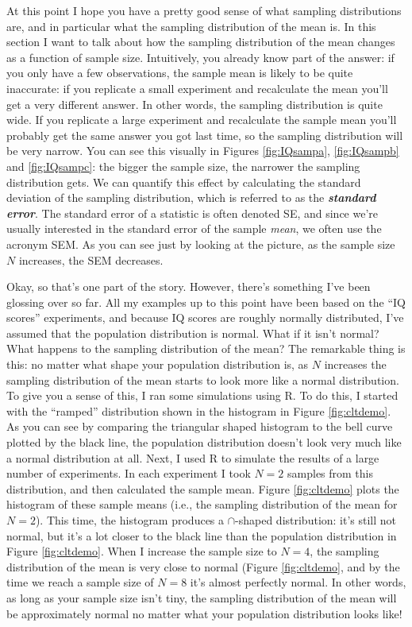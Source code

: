 \documentclass[
]{book}
\begin{document}
At this point I hope you have a pretty good sense of what sampling distributions are, and in particular what the sampling distribution of the mean is. In this section I want to talk about how the sampling distribution of the mean changes as a function of sample size. Intuitively, you already know part of the answer: if you only have a few observations, the sample mean is likely to be quite inaccurate: if you replicate a small experiment and recalculate the mean you'll get a very different answer. In other words, the sampling distribution is quite wide. If you replicate a large experiment and recalculate the sample mean you'll probably get the same answer you got last time, so the sampling distribution will be very narrow. You can see this visually in Figures \ref{fig:IQsampa}, \ref{fig:IQsampb} and \ref{fig:IQsampc}: the bigger the sample size, the narrower the sampling distribution gets. We can quantify this effect by calculating the standard deviation of the sampling distribution, which is referred to as the \textbf{\emph{standard error}}. The standard error of a statistic is often denoted SE, and since we're usually interested in the standard error of the sample \emph{mean}, we often use the acronym SEM. As you can see just by looking at the picture, as the sample size \(N\) increases, the SEM decreases.

Okay, so that's one part of the story. However, there's something I've been glossing over so far. All my examples up to this point have been based on the ``IQ scores'' experiments, and because IQ scores are roughly normally distributed, I've assumed that the population distribution is normal. What if it isn't normal? What happens to the sampling distribution of the mean? The remarkable thing is this: no matter what shape your population distribution is, as \(N\) increases the sampling distribution of the mean starts to look more like a normal distribution. To give you a sense of this, I ran some simulations using R. To do this, I started with the ``ramped'' distribution shown in the histogram in Figure \ref{fig:cltdemo}. As you can see by comparing the triangular shaped histogram to the bell curve plotted by the black line, the population distribution doesn't look very much like a normal distribution at all. Next, I used R to simulate the results of a large number of experiments. In each experiment I took \(N=2\) samples from this distribution, and then calculated the sample mean. Figure \ref{fig:cltdemo} plots the histogram of these sample means (i.e., the sampling distribution of the mean for \(N=2\)). This time, the histogram produces a \(\cap\)-shaped distribution: it's still not normal, but it's a lot closer to the black line than the population distribution in Figure \ref{fig:cltdemo}. When I increase the sample size to \(N=4\), the sampling distribution of the mean is very close to normal (Figure \ref{fig:cltdemo}, and by the time we reach a sample size of \(N=8\) it's almost perfectly normal. In other words, as long as your sample size isn't tiny, the sampling distribution of the mean will be approximately normal no matter what your population distribution looks like!
\end{document}

